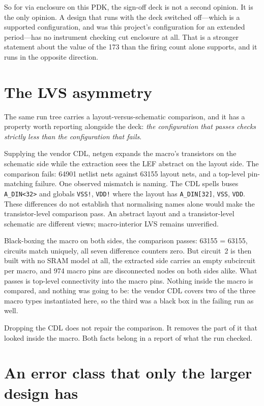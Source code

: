 \documentclass[11pt,a4paper]{article}
\begin{document}
So for via enclosure on this PDK, the sign-off deck is not a second
opinion. It is the only opinion. A design that runs with the deck
switched off---which is a supported configuration, and was this project's
configuration for an extended period---has no instrument checking cut
enclosure at all. That is a stronger statement about the value of the
\num{173} than the firing count alone supports, and it runs in the
opposite direction.

\section{The LVS asymmetry}
\label{sec:lvs}

The same run tree carries a layout-versus-schematic comparison, and it
has a property worth reporting alongside the deck: \emph{the
configuration that passes checks strictly less than the configuration
that fails}.

Supplying the vendor CDL, netgen expands the macro's transistors on the
schematic side while the extraction sees the LEF abstract on the layout
side. The comparison fails: \num{64901} netlist nets against \num{63155}
layout nets, and a top-level pin-matching failure. One observed mismatch
is naming. The CDL spells buses \texttt{A\_DIN<32>} and globals
\texttt{VSS!}, \texttt{VDD!} where the layout has \texttt{A\_DIN[32]},
\texttt{VSS}, \texttt{VDD}. These differences do not establish that
normalising names alone would make the transistor-level comparison pass.
An abstract layout and a transistor-level schematic are different views;
macro-interior LVS remains unverified.

Black-boxing the macro on both sides, the comparison passes:
\num{63155} = \num{63155}, circuits match uniquely, all seven difference
counters zero. But circuit~2 is then built with no SRAM model at all, the
extracted side carries an empty subcircuit per macro, and \num{974} macro
pins are disconnected nodes on both sides alike. What passes is top-level
connectivity into the macro pins. Nothing inside the macro is compared,
and nothing was going to be: the vendor CDL covers two of the three macro
types instantiated here, so the third was a black box in the failing run
as well.

Dropping the CDL does not repair the comparison. It removes the part of
it that looked inside the macro. Both facts belong in a report of what
the run checked.

\section{An error class that only the larger design has}
\label{sec:m2d}
\end{document}
